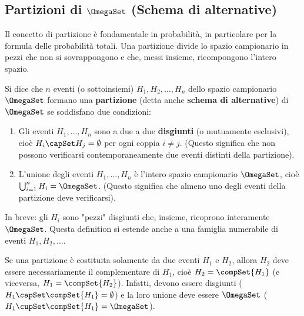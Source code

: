\subsection{Partizioni di \texorpdfstring{$\OmegaSet$}{Omega} (Schema di alternative)}
Il concetto di partizione è fondamentale in probabilità, in particolare per la formula delle probabilità totali. Una partizione divide lo spazio campionario in pezzi che non si sovrappongono e che, messi insieme, ricompongono l'intero spazio.

\begin{definition}
Si dice che $n$ eventi (o sottoinsiemi) $H_1, H_2, \dots, H_n$ dello spazio campionario $\OmegaSet$ formano una \textbf{partizione} (detta anche \textbf{schema di alternative}) di $\OmegaSet$ se soddisfano due condizioni:
\begin{enumerate}
    \item Gli eventi $H_1, \dots, H_n$ sono a due a due \textbf{disgiunti} (o mutuamente esclusivi), cioè $H_i \capSet H_j = \emptyset$ per ogni coppia $i \neq j$. (Questo significa che non possono verificarsi contemporaneamente due eventi distinti della partizione).
    \item L'unione degli eventi $H_1, \dots, H_n$ è l'intero spazio campionario $\OmegaSet$, cioè $\bigcup_{i=1}^n H_i = \OmegaSet$. (Questo significa che almeno uno degli eventi della partizione deve verificarsi).
\end{enumerate}
In breve: gli $H_i$ sono "pezzi" disgiunti che, insieme, ricoprono interamente $\OmegaSet$.
Questa definition si estende anche a una famiglia numerabile di eventi $H_1, H_2, \dots$.
\end{definition}

\begin{remark}
Se una partizione è costituita solamente da due eventi $H_1$ e $H_2$, allora $H_2$ deve essere necessariamente il complementare di $H_1$, cioè $H_2 = \compSet{H_1}$ (e viceversa, $H_1 = \compSet{H_2}$). Infatti, devono essere disgiunti ($H_1 \capSet \compSet{H_1} = \emptyset$) e la loro unione deve essere $\OmegaSet$ ($H_1 \cupSet \compSet{H_1} = \OmegaSet$).
\end{remark}

